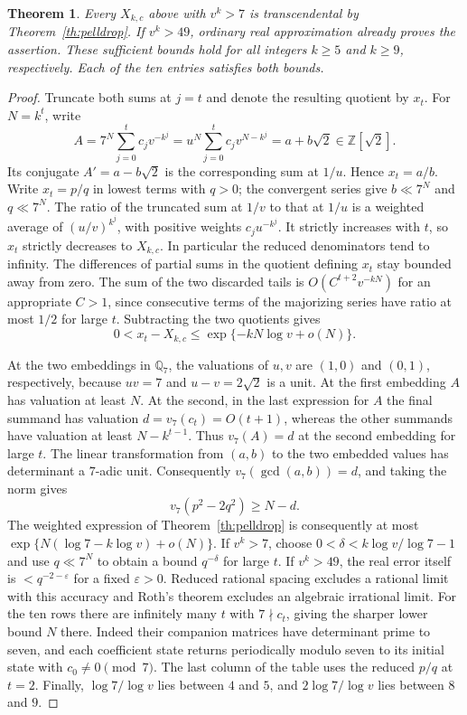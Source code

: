 \documentclass[11pt,a4paper]{article}
\newtheorem{theorem}{Theorem}[section]
\begin{document}
\begin{theorem}\label{th:pellten}
Every $X_{k,c}$ above with $v^k>7$ is transcendental by
Theorem~\ref{th:pelldrop}. If $v^k>49$, ordinary real approximation
already proves the assertion. These sufficient bounds hold for all
integers $k\ge5$ and $k\ge9$, respectively. Each of the ten entries
satisfies both bounds.
\end{theorem}
\begin{proof}
Truncate both sums at $j=t$ and denote the resulting quotient by $x_t$.
For $N=k^t$, write
\[
 A=7^N \sum_{j=0}^t c_jv^{-k^j}
   =u^N\sum_{j=0}^t c_jv^{N-k^j}
   =a+b\sqrt2\in\mathbb Z[\sqrt2].
\]
Its conjugate $A'=a-b\sqrt2$ is the corresponding sum at $1/u$.
Hence $x_t=a/b$. Write $x_t=p/q$ in lowest terms with $q>0$;
the convergent series give $b\ll 7^N$ and $q\ll 7^N$.
The ratio of the truncated sum at $1/v$ to that at $1/u$ is a
weighted average of $(u/v)^{k^j}$, with positive weights $c_ju^{-k^j}$.
It strictly increases with $t$, so $x_t$ strictly decreases to $X_{k,c}$.
In particular the reduced denominators tend to infinity. The differences of partial sums in the quotient defining $x_t$ stay bounded away from
zero. The sum of the two discarded tails is
$O(C^{t+2}v^{-kN})$ for an appropriate $C>1$, since consecutive
terms of the majorizing series have ratio at most $1/2$ for large $t$.
Subtracting the two quotients gives
\[
 0<x_t-X_{k,c}\le \exp\{-kN\log v+o(N)\}.
\]

At the two embeddings in $\mathbb Q_7$, the valuations of $u,v$ are
$(1,0)$ and $(0,1)$, respectively, because $uv=7$ and $u-v=2\sqrt2$
is a unit. At the first embedding $A$ has valuation at least $N$.
At the second, in the last expression for $A$ the final summand has
valuation $d=v_7(c_t)=O(t+1)$, whereas the other summands have
valuation at least $N-k^{t-1}$. Thus $v_7(A)=d$ at the second
embedding for large $t$. The linear transformation from $(a,b)$ to
the two embedded values has determinant a $7$-adic unit. Consequently
$v_7(\gcd(a,b))=d$, and taking the norm gives
\[
 v_7(p^2-2q^2)\ge N-d .
\]
The weighted expression of Theorem~\ref{th:pelldrop} is consequently
at most $\exp\{N(\log7-k\log v)+o(N)\}$. If $v^k>7$, choose
$0<\delta<k\log v/\log7-1$ and use $q\ll7^N$ to obtain a bound
$q^{-\delta}$ for large $t$. If $v^k>49$, the real error itself is
$<q^{-2-\varepsilon}$ for a fixed $\varepsilon>0$.
Reduced rational spacing excludes a rational limit with this accuracy
and Roth's theorem excludes an algebraic irrational limit.
For the ten rows there are infinitely many $t$ with $7\nmid c_t$, giving the sharper lower bound $N$ there. Indeed their companion matrices have determinant prime to seven, and each coefficient state returns periodically modulo seven to its initial state with $c_0\ne0\pmod7$. The last column of the table uses the reduced $p/q$ at $t=2$. Finally, $\log7/\log v$ lies between $4$ and $5$, and
$2\log7/\log v$ lies between $8$ and $9$.
\end{proof}
\end{document}

